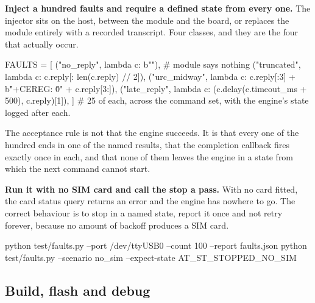 \begin{steps}
\item \textbf{Inject a hundred faults and require a defined state from every
one.} The injector sits on the host, between the module and the board, or
replaces the module entirely with a recorded transcript. Four classes, and they
are the four that actually occur.
\begin{pycode}
FAULTS = [
    ("no_reply",      lambda c: b""),                     # module says nothing
    ("truncated",     lambda c: c.reply[: len(c.reply) // 2]),
    ("urc_midway",    lambda c: c.reply[:3] + b"\r\n+CEREG: 0\r\n" + c.reply[3:]),
    ("late_reply",    lambda c: (c.delay(c.timeout_ms + 500), c.reply)[1]),
]
# 25 of each, across the command set, with the engine's state logged after each.
\end{pycode}
The acceptance rule is not that the engine succeeds. It is that every one of the
hundred ends in one of the named results, that the completion callback fires
exactly once in each, and that none of them leaves the engine in a state from
which the next command cannot start.

\item \textbf{Run it with no SIM card and call the stop a pass.} With no card
fitted, the card status query returns an error and the engine has nowhere to go.
The correct behaviour is to stop in a named state, report it once and not retry
forever, because no amount of backoff produces a SIM card.
\begin{shellcode}
python test/faults.py --port /dev/ttyUSB0 --count 100 --report faults.json
python test/faults.py --scenario no_sim --expect-state AT_ST_STOPPED_NO_SIM
\end{shellcode}
\end{steps}

\subsection*{Build, flash and debug}



